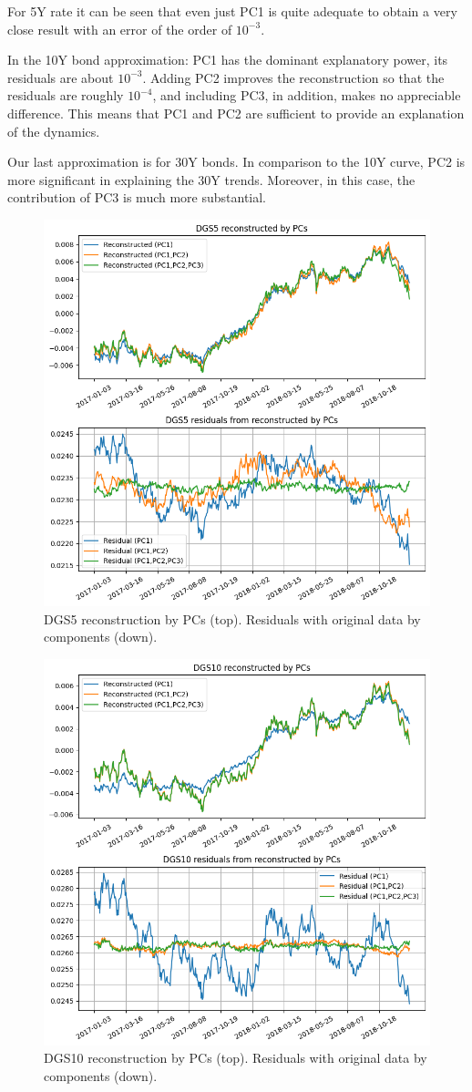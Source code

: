 For 5Y rate it can be seen that even just PC1 is quite adequate to obtain a very close result with an error of the order of $10^{-3}$.

In the 10Y bond approximation: PC1 has the dominant explanatory power, its residuals are about $10^{-3}$. Adding PC2 improves the reconstruction so that the residuals are roughly $10^{-4}$, and including PC3, in addition, makes no appreciable difference. This means that PC1 and PC2 are sufficient to provide an explanation of the dynamics.

Our last approximation is for 30Y bonds. In comparison to the 10Y curve, PC2 is more significant in explaining the 30Y trends. Moreover, in this case, the contribution of PC3 is much more substantial.

\begin{figure}[htb]
	\centering
	\includegraphics[width=0.65\linewidth]{figures/dgs5_reco}
	\caption{DGS5 reconstruction by PCs (top). Residuals with original data by components (down).}
	\label{fig:pca_dsg5}
\end{figure}

\begin{figure}[hp]
	\centering
	\includegraphics[width=0.65\linewidth]{figures/dgs10_reco}
	\caption{DGS10 reconstruction by PCs (top). Residuals with original data by components (down).}
	\label{fig:pca_dsg10}
\end{figure}

